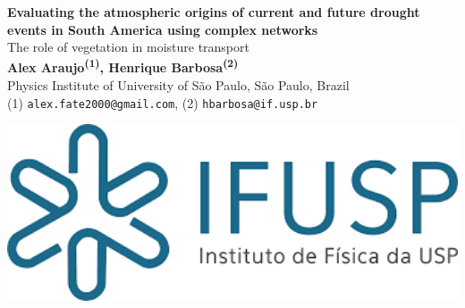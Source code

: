 \documentclass[a0, portrait]{a0poster}
\begin{document}
\begin{minipage}[b]{0.70\linewidth}
  \veryHuge \color{NavyBlue} \textbf{Evaluating the atmospheric origins of
    current and future drought events in South America using complex networks}
  \color{Black} \\[1cm] 
  \Huge The role of vegetation in moisture transport \\[2cm] %
  \huge \textbf{
    Alex Araujo\textsuperscript{(1)}, Henrique Barbosa\textsuperscript{(2)}}\\[0.5cm] 
  \huge Physics Institute of University of São Paulo, São Paulo, Brazil\\[0.4cm] 
  \Large (1) \texttt{alex.fate2000@gmail.com}, \: (2) \texttt{hbarbosa@if.usp.br} \\
\end{minipage}
%
\begin{minipage}[b]{0.30\linewidth}
\includegraphics[width=20cm]{logo.png}\\
\end{minipage}

\vspace{1cm} 
\end{document}
